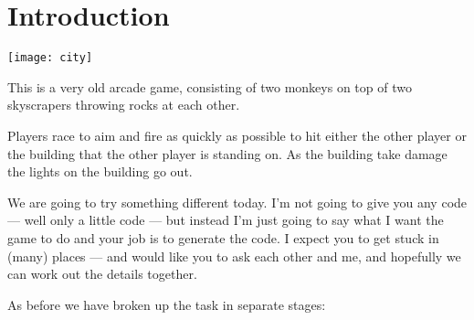 \documentclass{coderdojo}
\begin{document}
\maketitle


\section*{Introduction}

\begin{exercise}[title=Monkey Wars]

\begin{minipage}{.5\textwidth}
\centerline {\texttt{[image: city]}}
\end{minipage}
%
\begin{minipage}{.45\textwidth}

This is a very old arcade game, consisting of two monkeys on top of two skyscrapers throwing rocks at each other. 

Players race to aim and fire as quickly as possible to hit either the other player or the building that the other player is standing on.  As the building take damage the lights on the building go out. 
\end{minipage}

\end{exercise}

We are going to try something different today. I'm not going to give you any code --- well only a little code --- but instead I'm just going to say what I want the game to do and your job is to generate the code.  I expect you to get stuck in (many) places --- and would like you to ask each other and me, and hopefully we can work out the details together.

As before we have broken up the task in separate stages:
\end{document}
